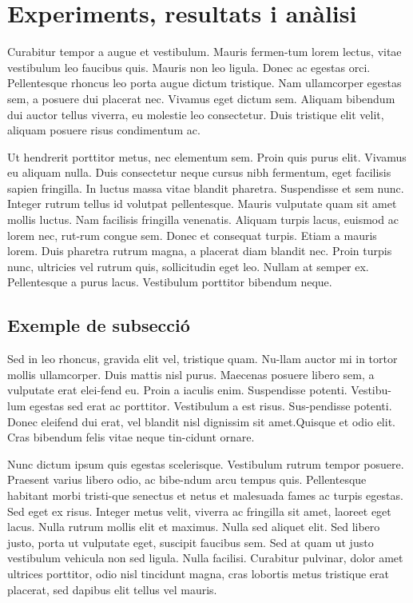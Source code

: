 ﻿\documentclass[10pt,a4paper,twocolumn,twoside]{article}
\begin{document}
 
\section{Experiments, resultats i anàlisi}

Curabitur tempor a augue et vestibulum. Mauris fermen-tum lorem lectus, vitae vestibulum leo faucibus quis. Mauris non leo ligula. Donec ac egestas orci. Pellentesque rhoncus leo porta augue dictum tristique. Nam ullamcorper egestas sem, a posuere dui placerat nec. Vivamus eget dictum sem. Aliquam bibendum dui auctor tellus viverra, eu molestie leo consectetur. Duis tristique elit velit, aliquam posuere risus condimentum ac. 

Ut hendrerit porttitor metus, nec elementum sem. Proin quis purus elit. Vivamus eu aliquam nulla. Duis consectetur neque cursus nibh fermentum, eget facilisis sapien fringilla. In luctus massa vitae blandit pharetra. Suspendisse et sem nunc. Integer rutrum tellus id volutpat pellentesque. Mauris vulputate quam sit amet mollis luctus. Nam facilisis fringilla venenatis. Aliquam turpis lacus, euismod ac lorem nec, rut-rum congue sem. Donec et consequat turpis. Etiam a mauris lorem. Duis pharetra rutrum magna, a placerat diam blandit nec. Proin turpis nunc, ultricies vel rutrum quis, sollicitudin eget leo. Nullam at semper ex. Pellentesque a purus lacus. Vestibulum porttitor bibendum neque. 

\subsection{Exemple de subsecció}


Sed in leo rhoncus, gravida elit vel, tristique quam. Nu-llam auctor mi in tortor mollis ullamcorper. Duis mattis nisl purus. Maecenas posuere libero sem, a vulputate erat elei-fend eu. Proin a iaculis enim. Suspendisse potenti. Vestibu-lum egestas sed erat ac porttitor. Vestibulum a est risus. Sus-pendisse potenti. Donec eleifend dui erat, vel blandit nisl dignissim sit amet.Quisque et odio elit. Cras bibendum felis vitae neque tin-cidunt ornare. 

Nunc dictum ipsum quis egestas scelerisque. Vestibulum rutrum tempor posuere. Praesent varius libero odio, ac bibe-ndum arcu tempus quis. Pellentesque habitant morbi tristi-que senectus et netus et malesuada fames ac turpis egestas. Sed eget ex risus. Integer metus velit, viverra ac fringilla sit amet, laoreet eget lacus. Nulla rutrum mollis elit et maximus. Nulla sed aliquet elit. Sed libero justo, porta ut vulputate eget, suscipit faucibus sem. Sed at quam ut justo vestibulum vehicula non sed ligula. Nulla facilisi. Curabitur pulvinar, dolor amet ultrices porttitor, odio nisl tincidunt magna, cras lobortis metus tristique erat placerat, sed dapibus elit tellus vel mauris.
\end{document}
